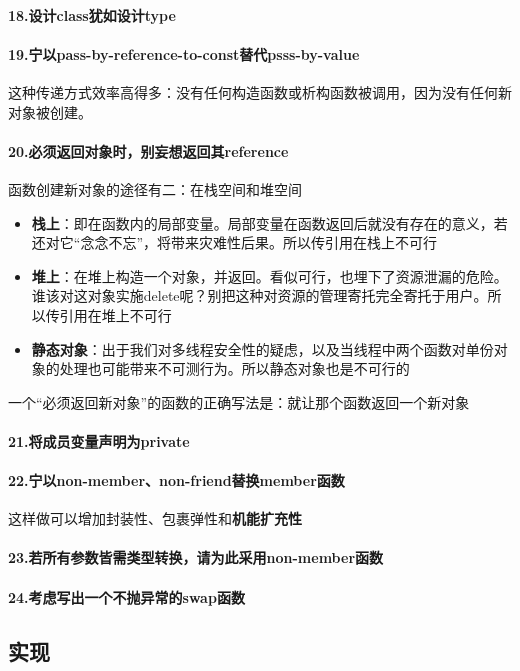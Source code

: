 \documentclass[UTF8,a4paper,12pt]{ctexbook}
\begin{document}
		\paragraph{18.设计class犹如设计type}
		\paragraph{19.宁以pass-by-reference-to-const替代psss-by-value} 这种传递方式效率高得多：没有任何构造函数或析构函数被调用，因为没有任何新对象被创建。
		
		\paragraph{20.必须返回对象时，别妄想返回其reference}
			函数创建新对象的途径有二：在栈空间和堆空间
			
			\begin{itemize}
				\item \textbf{栈上}：即在函数内的局部变量。局部变量在函数返回后就没有存在的意义，若还对它“念念不忘”，将带来灾难性后果。所以传引用在栈上不可行
				\item \textbf{堆上}：在堆上构造一个对象，并返回。看似可行，也埋下了资源泄漏的危险。谁该对这对象实施delete呢？别把这种对资源的管理寄托完全寄托于用户。所以传引用在堆上不可行
				\item \textbf{静态对象}：出于我们对多线程安全性的疑虑，以及当线程中两个函数对单份对象的处理也可能带来不可测行为。所以静态对象也是不可行的
			\end{itemize}
			
			一个“必须返回新对象”的函数的正确写法是：就让那个函数返回一个新对象
		\paragraph{21.将成员变量声明为private}
		\paragraph{22.宁以non-member、non-friend替换member函数} 这样做可以增加封装性、包裹弹性和\textbf{机能扩充性}
		\paragraph{23.若所有参数皆需类型转换，请为此采用non-member函数}
		\paragraph{24.考虑写出一个不抛异常的swap函数}
	\subsection{实现}
\end{document}
